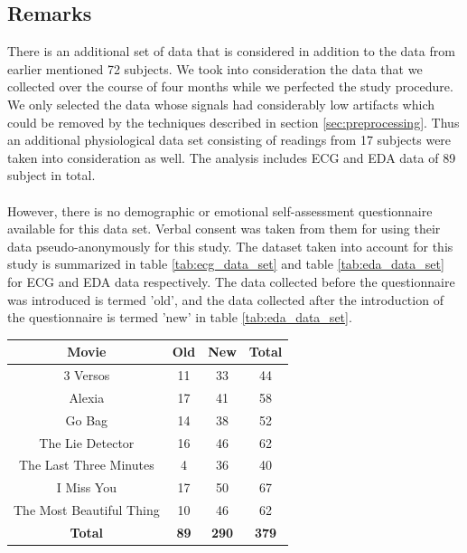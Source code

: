 \subsection{Remarks}
There is an additional set of data that is considered in addition to the data from earlier mentioned 72 subjects. We took into consideration the data that we collected over the course of four months while we perfected the study procedure. We only selected the data whose signals had considerably low artifacts which could be removed by the techniques described in section \ref{sec:preprocessing}. Thus an additional physiological data set consisting of readings from 17 subjects were taken into consideration as well. The analysis includes ECG and EDA data of 89 subject in total.

\paragraph{}However, there is no demographic or emotional self-assessment questionnaire available for this data set. Verbal consent was taken from them for using their data pseudo-anonymously for this study. The dataset taken into account for this study is summarized in table \ref{tab:ecg_data_set} and table \ref{tab:eda_data_set} for ECG and EDA data respectively. The data collected before the questionnaire was introduced is termed 'old', and the data collected after the introduction of the questionnaire is termed 'new' in table \ref{tab:eda_data_set}. 


\begin{center}
\begin{tabular}{ |c|c|c|c| }
\hline
Movie & Old & New & Total \\
\hline
\hline
3 Versos & 11 & 33 & 44 \\
\hline
Alexia & 17 & 41 & 58 \\
\hline
Go Bag & 14 & 38 & 52 \\
\hline
The Lie Detector & 16 & 46 & 62 \\
\hline
The Last Three Minutes & 4 & 36 & 40 \\
\hline
I Miss You & 17 & 50 & 67 \\
\hline
The Most Beautiful Thing & 10 & 46 & 62 \\
\hline
\textbf{Total} & \textbf{89} & \textbf{290} & \textbf{379} \\
\hline
\end{tabular}
\label{tab:ecg_data_set}
\end{center}

